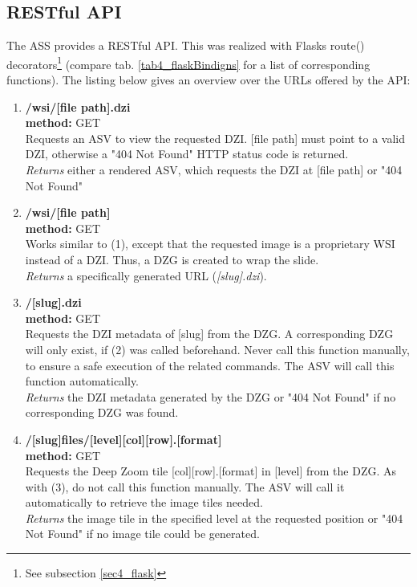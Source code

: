 \subsection{RESTful API}
\label{sec4_api}
The ASS provides a RESTful API. This was realized with Flasks route() decorators\footnote{See subsection \ref{sec4_flask}} (compare tab. \ref{tab4_flaskBindigns} for a list of corresponding functions). The listing below gives an overview over the URLs offered by the API:

\begin{enumerate}[(1) -]
	\item\textbf{/wsi/[file path].dzi\\
	method:} GET\\
	Requests an ASV to view the requested DZI. [file path] must point to a valid DZI, otherwise a "404 Not Found" HTTP status code is returned.\\
	\emph{Returns} either a rendered ASV, which requests the DZI at [file path] or "404 Not Found"
	
	\item \textbf{/wsi/[file path]\\
	method:} GET\\
	Works similar to (1), except that the requested image is a proprietary WSI instead of a DZI. Thus, a DZG is created to wrap the slide.\\
	\emph{Returns} a specifically generated URL (\emph{[slug].dzi}).
	
	\item \textbf{/[slug].dzi\\
	method:} GET\\
	Requests the DZI metadata of [slug] from the DZG. A corresponding DZG will only exist, if (2) was called beforehand. Never call this function manually, to ensure a safe execution of the related commands. The ASV will call this function automatically.\\
	\emph{Returns} the DZI metadata generated by the DZG or "404 Not Found" if no corresponding DZG was found.
	
	\item \textbf{/[slug]{\textunderscore}files/[level]{\textunderscore}[col]{\textunderscore}[row].[format]\\
	method:} GET\\
	Requests the Deep Zoom tile [col]{\textunderscore}[row].[format] in [level] from the DZG. As with (3), do not call this function manually. The ASV will call it automatically to retrieve the image tiles needed.\\
	\emph{Returns} the image tile in the specified level at the requested position or "404 Not Found" if no image tile could be generated.
	

\end{enumerate}
